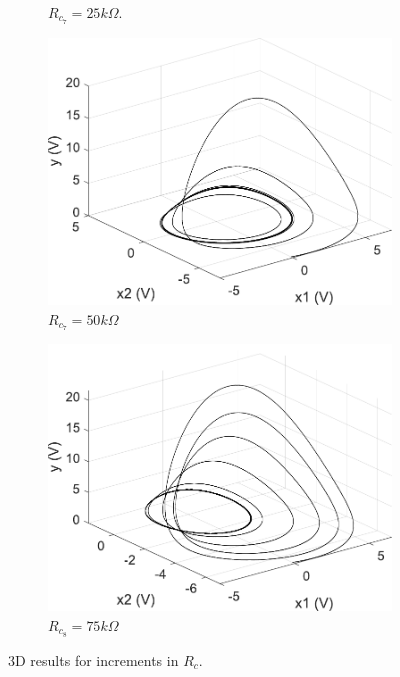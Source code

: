 \begin{figure}
\begin{subfigure}[b]{0.22\textwidth}
            \caption{$R_{c_7} = 25k\Omega$.}  
        \end{subfigure}
        \begin{subfigure}[b]{0.22\textwidth}   
            \centering 
            \includegraphics[scale=0.28]{figs/paraCup/3dParaC50.pdf}
            \caption{$R_{c_7} = 50k\Omega$}    
        \end{subfigure}
        \begin{subfigure}[b]{0.22\textwidth}   
            \centering 
            \includegraphics[scale=0.28]{figs/paraCup/3dParaC75.pdf}
            \caption{$R_{c_8} = 75k\Omega$}   
        \end{subfigure}
        \caption{3D results for increments in $R_c$.} 
        \label{fig:3dparaCvarUp}
	\end{figure}
	
